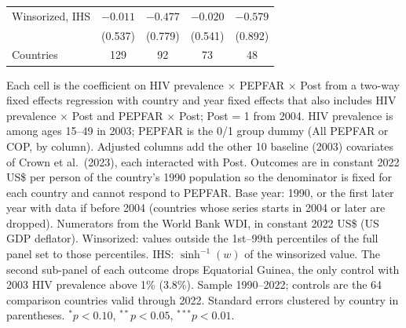 \begin{table}[htbp]
\begin{tabular}{lcccc}
Winsorized, IHS & $-0.011$ & $-0.477$ & $-0.020$ & $-0.579$ \\
 & (0.537) & (0.779) & (0.541) & (0.892) \\
Countries & 129 & 92 & 73 & 48 \\
\bottomrule
\end{tabular}
\par\vspace{4pt}
\begin{minipage}{\textwidth}\footnotesize Each cell is the coefficient on HIV prevalence $\times$ PEPFAR $\times$ Post from a two-way fixed effects regression with country and year fixed effects that also includes HIV prevalence $\times$ Post and PEPFAR $\times$ Post; Post = 1 from 2004. HIV prevalence is among ages 15--49 in 2003; PEPFAR is the 0/1 group dummy (All PEPFAR or COP, by column). Adjusted columns add the other 10 baseline (2003) covariates of Crown et al.\ (2023), each interacted with Post. Outcomes are in constant 2022 US\$ per person of the country's 1990 population so the denominator is fixed for each country and cannot respond to PEPFAR. Base year: 1990, or the first later year with data if before 2004 (countries whose series starts in 2004 or later are dropped). Numerators from the World Bank WDI, in constant 2022 US\$ (US GDP deflator). Winsorized: values outside the 1st--99th percentiles of the full panel set to those percentiles. IHS: $\sinh^{-1}(w)$ of the winsorized value. The second sub-panel of each outcome drops Equatorial Guinea, the only control with 2003 HIV prevalence above 1\% (3.8\%). Sample 1990--2022; controls are the 64 comparison countries valid through 2022. Standard errors clustered by country in parentheses. $^{*}p<0.10$, $^{**}p<0.05$, $^{***}p<0.01$.\end{minipage}
\end{table}
